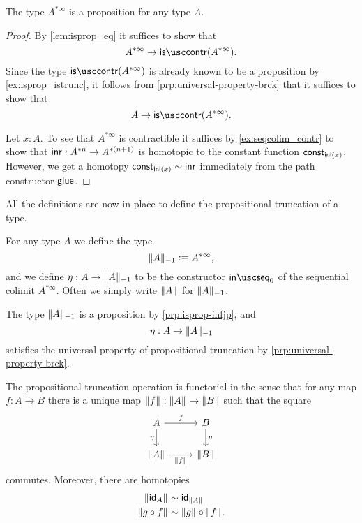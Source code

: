 \begin{prp}\label{prp:isprop-infjp}
The type $A^{\ast\infty}$ is a proposition for any type $A$.
\end{prp}

\begin{proof}
  By \cref{lem:isprop_eq} it suffices to show that
  \begin{equation*}
    A^{\ast\infty}\to \iscontr(A^{\ast\infty}).
  \end{equation*}
  Since the type $\iscontr(A^{\ast\infty})$ is already known to be a proposition by \cref{ex:isprop_istrunc}, it follows from \cref{prp:universal-property-brck} that it suffices to show that
\begin{equation*}
A\to \iscontr(A^{\ast\infty}).
\end{equation*}

Let $x:A$. To see that $A^{\ast\infty}$ is contractible it suffices by \cref{ex:seqcolim_contr} to show that $\inr:A^{\ast n}\to A^{\ast(n+1)}$ is homotopic to the constant function $\const_{\inl(x)}$. However, we get a homotopy $\const_{\inl(x)}\htpy \inr$ immediately from the path constructor $\glue$.  
\end{proof}

All the definitions are now in place to define the propositional truncation of a type.

\begin{defn}
  For any type $A$ we define the type
  \begin{equation*}
    \trunc{-1}{A}\defeq A^{\ast\infty},
  \end{equation*}
  and we define $\eta:A\to\trunc{-1}{A}$ to be the constructor $\seqin_0$ of the sequential colimit $A^{\ast\infty}$. Often we simply write $\brck{A}$ for $\trunc{-1}{A}$.
\end{defn}

The type $\trunc{-1}{A}$ is a proposition by \cref{prp:isprop-infjp}, and
\begin{equation*}
  \eta:A\to\trunc{-1}{A}
\end{equation*}
satisfies the universal property of propositional truncation by \cref{prp:universal-property-brck}.

\begin{prp}
  The propositional truncation operation is functorial in the sense that for any map $f:A\to B$ there is a unique map $\brck{f}:\brck{A}\to\brck{B}$ such that the square
  \begin{equation*}
    \begin{tikzcd}
      A \arrow[r,"f"] \arrow[d,swap,"\eta"] & B \arrow[d,"\eta"] \\
      \brck{A} \arrow[r,swap,"\brck{f}"] & \brck{B}
    \end{tikzcd}
  \end{equation*}
  commutes. Moreover, there are homotopies
  \begin{align*}
    \brck{\idfunc[A]} & \htpy \idfunc[\brck{A}] \\
    \brck{g\circ f} & \htpy \brck{g}\circ\brck{f}.
  \end{align*}
\end{prp}

